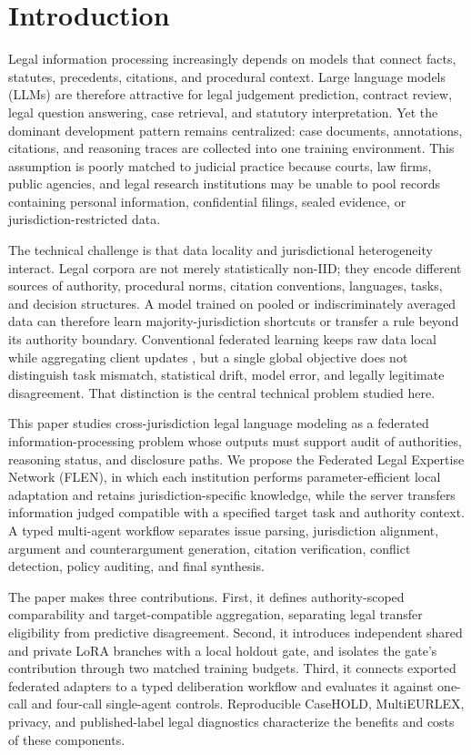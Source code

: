 \documentclass[a4paper,fleqn]{cas-sc}
\begin{document}
\section{Introduction}

Legal information processing increasingly depends on models that connect facts, statutes, precedents, citations, and procedural context. Large language models (LLMs) are therefore attractive for legal judgement prediction, contract review, legal question answering, case retrieval, and statutory interpretation. Yet the dominant development pattern remains centralized: case documents, annotations, citations, and reasoning traces are collected into one training environment. This assumption is poorly matched to judicial practice because courts, law firms, public agencies, and legal research institutions may be unable to pool records containing personal information, confidential filings, sealed evidence, or jurisdiction-restricted data.

The technical challenge is that data locality and jurisdictional heterogeneity interact. Legal corpora are not merely statistically non-IID; they encode different sources of authority, procedural norms, citation conventions, languages, tasks, and decision structures. A model trained on pooled or indiscriminately averaged data can therefore learn majority-jurisdiction shortcuts or transfer a rule beyond its authority boundary. Conventional federated learning keeps raw data local while aggregating client updates \citep{mcmahan2017communication,kairouz2021advances}, but a single global objective does not distinguish task mismatch, statistical drift, model error, and legally legitimate disagreement. That distinction is the central technical problem studied here.

This paper studies cross-jurisdiction legal language modeling as a federated information-processing problem whose outputs must support audit of authorities, reasoning status, and disclosure paths. We propose the Federated Legal Expertise Network (FLEN), in which each institution performs parameter-efficient local adaptation and retains jurisdiction-specific knowledge, while the server transfers information judged compatible with a specified target task and authority context. A typed multi-agent workflow separates issue parsing, jurisdiction alignment, argument and counterargument generation, citation verification, conflict detection, policy auditing, and final synthesis.

The paper makes three contributions. First, it defines authority-scoped comparability and target-compatible aggregation, separating legal transfer eligibility from predictive disagreement. Second, it introduces independent shared and private LoRA branches with a local holdout gate, and isolates the gate's contribution through two matched training budgets. Third, it connects exported federated adapters to a typed deliberation workflow and evaluates it against one-call and four-call single-agent controls. Reproducible CaseHOLD, MultiEURLEX, privacy, and published-label legal diagnostics characterize the benefits and costs of these components.
\end{document}
